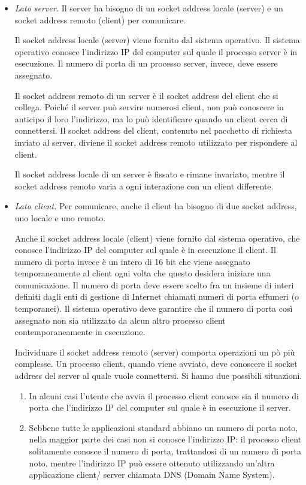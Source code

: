\begin{itemize}
    \item \textit{Lato server.} Il server ha bisogno di un socket address locale (server) e un socket address remoto (client) per comunicare.

    Il socket address locale (server) viene fornito dal sistema operativo. Il sistema operativo conosce l'indirizzo IP del computer sul quale il processo server è in esecuzione. Il numero di porta di un processo server, invece, deve essere assegnato.

    Il socket address remoto di un server è il socket address del client che si collega. Poiché il server può servire numerosi client, non può conoscere in anticipo il loro l'indirizzo, ma lo può identificare quando un client cerca di connettersi. Il socket address del client, contenuto nel pacchetto di richiesta inviato al server, diviene il socket address remoto utilizzato per rispondere al client. 
    
    Il socket address locale di un server è fissato e rimane invariato, mentre il socket address remoto varia a ogni interazione con un client differente.

    \item \textit{Lato client.} Per comunicare, anche il client ha bisogno di due socket address, uno locale e uno remoto. 
    
    Anche il socket address locale (client) viene fornito dal sistema operativo, che conosce l'indirizzo IP del computer sul quale è in esecuzione il client. Il numero di porta invece è un intero di 16 bit che viene assegnato temporaneamente al client ogni volta che questo desidera iniziare una comunicazione. Il numero di porta deve essere scelto fra un insieme di interi definiti dagli enti di gestione di Internet chiamati numeri di porta effumeri (o temporanei). Il sistema operativo deve garantire che il numero di porta così assegnato non sia utilizzato da alcun altro processo client contemporaneamente in esecuzione.

    Individuare il socket address remoto (server) comporta operazioni un pò più complesse. Un processo client, quando viene avviato, deve conoscere il socket address del server al quale vuole connettersi. Si hanno due possibili situazioni.

    \begin{enumerate}
        \item In alcuni casi l'utente che avvia il processo client conosce sia il numero di porta che l'indirizzo IP del computer sul quale è in esecuzione il server.
        \item Sebbene tutte le applicazioni standard abbiano un numero di porta noto, nella maggior parte dei casi non si conosce l'indirizzo IP: il processo client solitamente conosce il numero di porta, trattandosi di un numero di porta noto, mentre l'indirizzo IP può essere ottenuto utilizzando un'altra applicazione client/ server chiamata DNS (Domain Name System).
    \end{enumerate}
\end{itemize}

